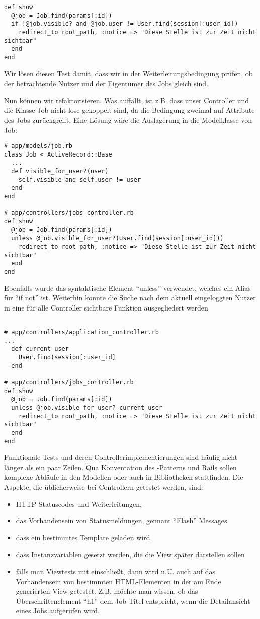 \begin{lstlisting}
def show
  @job = Job.find(params[:id])
  if !@job.visible? and @job.user != User.find(session[:user_id])
    redirect_to root_path, :notice => "Diese Stelle ist zur Zeit nicht sichtbar"
  end
end
\end{lstlisting}
\tddgreen
Wir lösen diesen Test damit, dass wir in der Weiterleitungsbedingung prüfen, ob der betrachtende Nutzer und der Eigentümer des Jobs gleich sind.

Nun können wir refaktorisieren. Was auffällt, ist z.B. dass unser Controller und die Klasse Job nicht lose gekoppelt sind, da die Bedingung zweimal auf Attribute des Jobs zurückgreift. Eine Lösung wäre die Auslagerung in die Modelklasse von Job:
\tddrefactor
\begin{lstlisting}
# app/models/job.rb
class Job < ActiveRecord::Base
  ...
  def visible_for_user?(user)
    self.visible and self.user != user
  end 
end

# app/controllers/jobs_controller.rb 
def show
  @job = Job.find(params[:id])
  unless @job.visible_for_user?(User.find(session[:user_id]))
    redirect_to root_path, :notice => "Diese Stelle ist zur Zeit nicht sichtbar"
  end
end
\end{lstlisting}
Ebenfalls wurde das syntaktische Element "`unless"' verwendet, welches ein Alias für "`if not"' ist.
Weiterhin könnte die Suche nach dem aktuell eingeloggten Nutzer in eine für alle Controller sichtbare Funktion ausgegliedert werden
\tddrefactor
\begin{lstlisting}

# app/controllers/application_controller.rb
...
  def current_user
    User.find(session[:user_id]
  end

# app/controllers/jobs_controller.rb 
def show
  @job = Job.find(params[:id])
  unless @job.visible_for_user? current_user
    redirect_to root_path, :notice => "Diese Stelle ist zur Zeit nicht sichtbar"
  end
end
\end{lstlisting}



Funktionale Tests und deren Controllerimplementierungen sind häufig nicht länger als ein paar Zeilen. Qua Konventation des -Patterns und Rails sollen komplexe Abläufe in den Modellen oder auch in Bibliotheken stattfinden. 
Die Aspekte, die üblicherweise bei Controllern getestet werden, sind:
\begin{itemize}
 \item HTTP Statuscodes und Weiterleitungen,
 \item das Vorhandensein von Statusmeldungen, gennant "`Flash"' Messages
 \item dass ein bestimmtes Template geladen wird
 \item dass Instanzvariablen gesetzt werden, die die View später darstellen sollen
 \item falls man Viewtests mit einschließt, dann wird u.U. auch auf das Vorhandensein von bestimmten HTML-Elementen in der am Ende generierten View getestet. Z.B. möchte man wissen, ob das Überschriftenelement "`h1"' dem Job-Titel entspricht, wenn die Detailansicht eines Jobs aufgerufen wird.
\end{itemize}